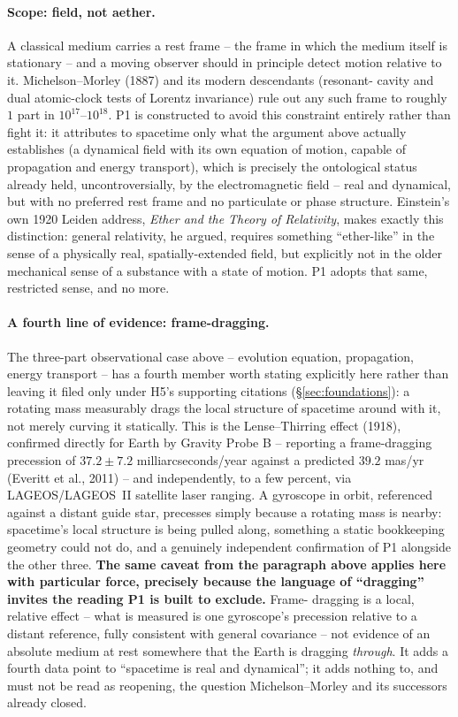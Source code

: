 \documentclass[12pt, a4paper]{article}
\begin{document}
\paragraph{Scope: field, not aether.} A classical medium carries a
rest frame -- the frame in which the medium itself is stationary --
and a moving observer should in principle detect motion relative to
it. Michelson--Morley (1887) and its modern descendants (resonant-
cavity and dual atomic-clock tests of Lorentz invariance) rule out
any such frame to roughly $1$ part in $10^{17}$--$10^{18}$. P1 is
constructed to avoid this constraint entirely rather than fight it:
it attributes to spacetime only what the argument above actually
establishes (a dynamical field with its own equation of motion,
capable of propagation and energy transport), which is precisely the
ontological status already held, uncontroversially, by the
electromagnetic field -- real and dynamical, but with no preferred
rest frame and no particulate or phase structure. Einstein's own 1920
Leiden address, \emph{Ether and the Theory of Relativity}, makes
exactly this distinction: general relativity, he argued, requires
something ``ether-like'' in the sense of a physically real,
spatially-extended field, but explicitly not in the older mechanical
sense of a substance with a state of motion. P1 adopts that same,
restricted sense, and no more.

\paragraph{A fourth line of evidence: frame-dragging.} The three-part
observational case above -- evolution equation, propagation, energy
transport -- has a fourth member worth stating explicitly here rather
than leaving it filed only under H5's supporting citations
(\S\ref{sec:foundations}): a rotating mass measurably drags the local
structure of spacetime around with it, not merely curving it
statically. This is the Lense--Thirring effect (1918), confirmed
directly for Earth by Gravity Probe B -- reporting a frame-dragging
precession of $37.2\pm7.2$ milliarcseconds/year against a predicted
$39.2$ mas/yr (Everitt et al., 2011) -- and independently, to a few
percent, via LAGEOS/LAGEOS~II satellite laser ranging. A gyroscope in
orbit, referenced against a distant guide star, precesses simply
because a rotating mass is nearby: spacetime's local structure is
being pulled along, something a static bookkeeping geometry could not
do, and a genuinely independent confirmation of P1 alongside the
other three. \textbf{The same caveat from the paragraph above applies
here with particular force, precisely because the language of
``dragging'' invites the reading P1 is built to exclude.} Frame-
dragging is a local, relative effect -- what is measured is one
gyroscope's precession relative to a distant reference, fully
consistent with general covariance -- not evidence of an absolute
medium at rest somewhere that the Earth is dragging \emph{through}.
It adds a fourth data point to ``spacetime is real and dynamical''; it
adds nothing to, and must not be read as reopening, the question
Michelson--Morley and its successors already closed.
\end{document}
